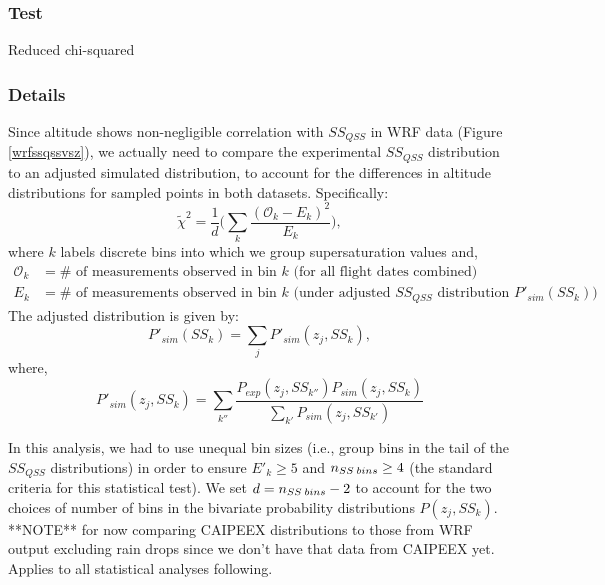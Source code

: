 \documentclass{article}
\begin{document}
\subsubsection{Test}
Reduced chi-squared
\subsubsection{Details}
Since altitude shows non-negligible correlation with $SS_{QSS}$ in WRF data (Figure \ref{wrfssqssvsz}), we actually need to compare the experimental $SS_{QSS}$ distribution to an adjusted simulated distribution, to account for the differences in altitude distributions for sampled points in both datasets. Specifically:
\begin{equation}
\tilde\chi^2 = \frac{1}{d}\Big(\sum_{k} \frac{(\mathcal{O}_k - E_k)^2}{E_k}\Big),
\end{equation}
where $k$ labels discrete bins into which we group supersaturation values and,
\begin{align}
\mathcal{O}_k &= \text{# of measurements observed in bin $k$ (for all flight dates combined)}\nonumber\\
E_k &= \text{# of measurements observed in bin $k$ (under adjusted $SS_{QSS}$ distribution $P'_{sim}(SS_k)$)}\nonumber
\end{align}
The adjusted distribution is given by:
\begin{equation}
P'_{sim}(SS_k) = \sum_{j} P'_{sim}(z_j, SS_k),
\end{equation}
where,
\begin{equation}
P'_{sim}(z_j, SS_k) = \sum_{k''}\frac{P_{exp}(z_j, SS_{k''})P_{sim}(z_j, SS_k)}{\sum_{k'}P_{sim}(z_j, SS_{k'})}
\end{equation}

In this analysis, we had to use unequal bin sizes (i.e., group bins in the tail of the $SS_{QSS}$ distributions) in order to ensure $E'_k \geq 5$ and $n_{SS\hspace{0.2em}bins} \geq 4$ (the standard criteria for this statistical test). We set $d = n_{SS\hspace{0.2em}bins} - 2$ to account for the two choices of number of bins in the bivariate probability distributions $P(z_j, SS_k)$. \\

**NOTE** for now comparing CAIPEEX distributions to those from WRF output excluding rain drops since we don't have that data from CAIPEEX yet. Applies to all statistical analyses following.
\end{document}

